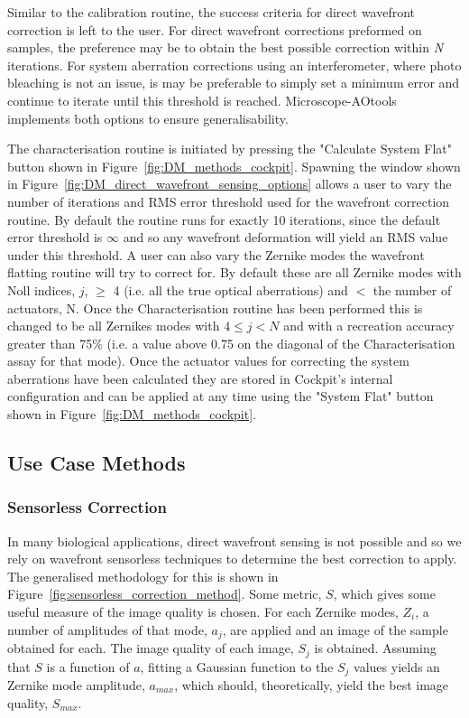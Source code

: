 Similar to the calibration routine, the success criteria for direct wavefront correction is left to the user. For direct wavefront corrections preformed on samples, the preference may be to obtain the best possible correction within \textit{N} iterations. For system aberration corrections using an interferometer, where photo bleaching is not an issue, is may be preferable to simply set a minimum error and continue to iterate until this threshold is reached. Microscope-AOtools implements both options to ensure generalisability.

The characterisation routine is initiated by pressing the "Calculate System Flat" button shown in Figure~\ref{fig:DM_methods_cockpit}. Spawning the window shown in Figure~\ref{fig:DM_direct_wavefront_sensing_options} allows a user to vary the number of iterations and RMS error threshold used for the wavefront correction routine. By default the routine runs for exactly 10 iterations, since the default error threshold is $\infty$ and so any wavefront deformation will yield an RMS value under this threshold. A user can also vary the Zernike modes the wavefront flatting routine will try to correct for. By default these are all Zernike modes with Noll indices, $j$, $\ge$ 4 (i.e. all the true optical aberrations) and $<$ the number of actuators, N. Once the Characterisation routine has been performed this is changed to be all Zernikes modes with $4 \le j < N$ and with a recreation accuracy greater than 75\% (i.e. a value above 0.75 on the diagonal of the Characterisation assay for that mode). Once the actuator values for correcting the system aberrations have been calculated they are stored in Cockpit's internal configuration and can be applied at any time using the "System Flat" button shown in Figure~\ref{fig:DM_methods_cockpit}.

\subsection{Use Case Methods}
\label{subsec:use_case_methods}

\subsubsection{Sensorless Correction}
\label{subsubsec:sensorless_correction}

In many biological applications, direct wavefront sensing is not possible and so we rely on wavefront sensorless techniques to determine the best correction to apply. The generalised methodology for this is shown in Figure~\ref{fig:sensorless_correction_method}. Some metric, $S$, which gives some useful measure of the image quality is chosen. For each Zernike modes, $Z_{i}$, a number of amplitudes of that mode, $a_{j}$, are applied and an image of the sample obtained for each. The image quality of each image, $S_{j}$ is obtained. Assuming that $S$ is a function of $a$, fitting a Gaussian function to the $S_{j}$ values yields an Zernike mode amplitude, $a_{max}$, which should, theoretically, yield the best image quality, $S_{max}$. 


